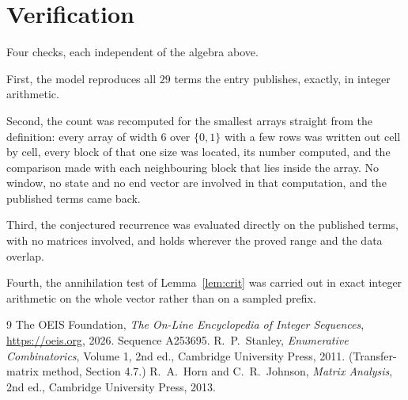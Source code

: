 \documentclass[11pt,a4paper]{article}
\theoremstyle{plain}
\theoremstyle{definition}
\begin{document}
\section{Verification}

Four checks, each independent of the algebra above.

First, the model reproduces all $29$ terms the entry publishes, exactly, in integer
arithmetic.

Second, the count was recomputed for the smallest arrays straight from the definition: every
array of width $6$ over $\{0,1\}$ with a few rows was written out cell by cell, every block of
that one size was located, its number computed, and the comparison made with each neighbouring block
that lies inside the array. No window, no state and no end vector are involved in that
computation, and the published terms came back.

Third, the conjectured recurrence was evaluated directly on the published terms, with no
matrices involved, and holds wherever the proved range and the data overlap.

Fourth, the annihilation test of Lemma~\ref{lem:crit} was carried out in exact integer
arithmetic on the whole vector rather than on a sampled prefix.

\begin{thebibliography}{9}
 The OEIS Foundation, \emph{The On-Line Encyclopedia of Integer
Sequences}, \url{https://oeis.org}, 2026. Sequence A253695.
 R.~P.~Stanley, \emph{Enumerative Combinatorics}, Volume 1, 2nd ed.,
Cambridge University Press, 2011. (Transfer-matrix method, Section 4.7.)
 R.~A.~Horn and C.~R.~Johnson, \emph{Matrix Analysis}, 2nd ed., Cambridge
University Press, 2013.
\end{thebibliography}
\end{document}
